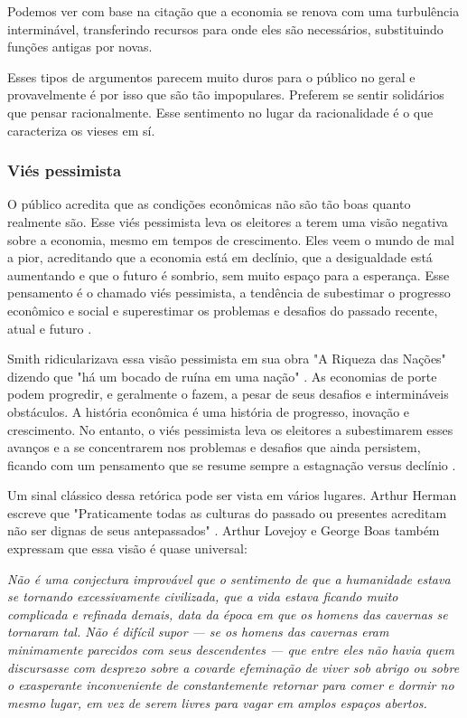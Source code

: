 Podemos ver com base na citação que a economia se renova com uma turbulência interminável, transferindo recursos para onde eles são necessários, substituindo funções antigas por novas.

Esses tipos de argumentos parecem muito duros para o público no geral e provavelmente é por isso que são tão impopulares. Preferem se sentir solidários que pensar racionalmente. Esse sentimento no lugar da racionalidade é o que caracteriza os vieses em sí.

\subsubsection{Viés pessimista}

O público acredita que as condições econômicas não são tão boas quanto realmente são. Esse viés pessimista leva os eleitores a terem uma visão negativa sobre a economia, mesmo em tempos de crescimento. Eles veem o mundo de mal a pior, acreditando que a economia está em declínio, que a desigualdade está aumentando e que o futuro é sombrio, sem muito espaço para a esperança. Esse pensamento é o chamado viés pessimista, a tendência de subestimar o progresso econômico e social e superestimar os problemas e desafios do passado recente, atual e futuro \cite{The_Myth_of_the_Rational_Voter}.

Smith ridicularizava essa visão pessimista em sua obra "A Riqueza das Nações" dizendo que "há um bocado de ruína em uma nação" \cite{smith1776inquiry}. As economias de porte podem progredir, e geralmente o fazem, a pesar de seus desafios e intermináveis obstáculos. A história econômica é uma história de progresso, inovação e crescimento. No entanto, o viés pessimista leva os eleitores a subestimarem esses avanços e a se concentrarem nos problemas e desafios que ainda persistem, ficando com um pensamento que se resume sempre a estagnação versus declínio \cite{The_Myth_of_the_Rational_Voter}.

Um sinal clássico dessa retórica pode ser vista em vários lugares. Arthur Herman escreve que "Praticamente todas as culturas do passado ou presentes acreditam não ser dignas de seus antepassados" \cite{herman1997idea}. Arthur Lovejoy e George Boas também expressam que essa visão é quase universal:

\begin{citacao}
    \textit{
        Não é uma conjectura improvável que o sentimento de que a humanidade estava se tornando excessivamente civilizada, que a vida estava ficando muito complicada e refinada demais, data da época em que os homens das cavernas se tornaram tal. Não é difícil supor — se os homens das cavernas eram minimamente parecidos com seus descendentes — que entre eles não havia quem discursasse com desprezo sobre a covarde efeminação de viver sob abrigo ou sobre o exasperante inconveniente de constantemente retornar para comer e dormir no mesmo lugar, em vez de serem livres para vagar em amplos espaços abertos.
    } \newline
    \cite{lovejoy_boas_1965}
\end{citacao}

